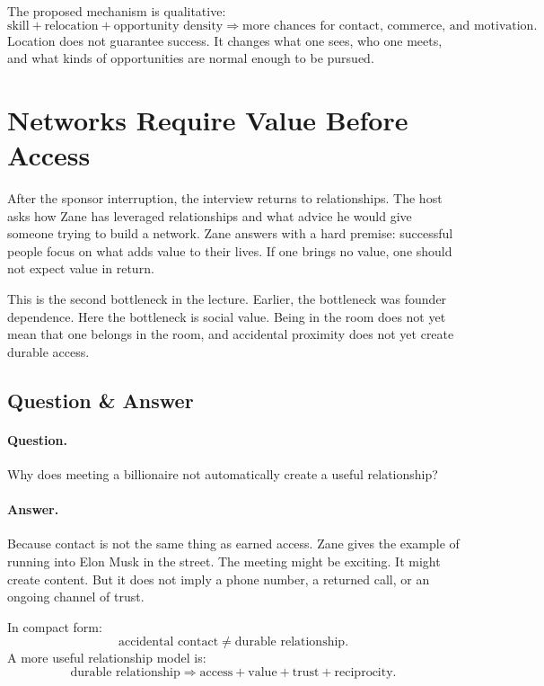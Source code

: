 The proposed mechanism is qualitative:
\begin{equation}
\text{skill}+\text{relocation}+\text{opportunity density}
\Rightarrow
\text{more chances for contact, commerce, and motivation}.
\end{equation}
Location does not guarantee success. It changes what one sees, who one meets, and what kinds of opportunities are normal enough to be pursued.

\section{Networks Require Value Before Access}

After the sponsor interruption, the interview returns to relationships. The host asks how Zane has leveraged relationships and what advice he would give someone trying to build a network. Zane answers with a hard premise: successful people focus on what adds value to their lives. If one brings no value, one should not expect value in return.

This is the second bottleneck in the lecture. Earlier, the bottleneck was founder dependence. Here the bottleneck is social value. Being in the room does not yet mean that one belongs in the room, and accidental proximity does not yet create durable access.

\subsection{Question \& Answer}

\paragraph{Question.}
Why does meeting a billionaire not automatically create a useful relationship?

\paragraph{Answer.}
Because contact is not the same thing as earned access. Zane gives the example of running into Elon Musk in the street. The meeting might be exciting. It might create content. But it does not imply a phone number, a returned call, or an ongoing channel of trust.

In compact form:
\begin{equation}
\text{accidental contact}\neq \text{durable relationship}.
\end{equation}
A more useful relationship model is:
\begin{equation}
\text{durable relationship}
\Rightarrow
\text{access}+\text{value}+\text{trust}+\text{reciprocity}.
\end{equation}


